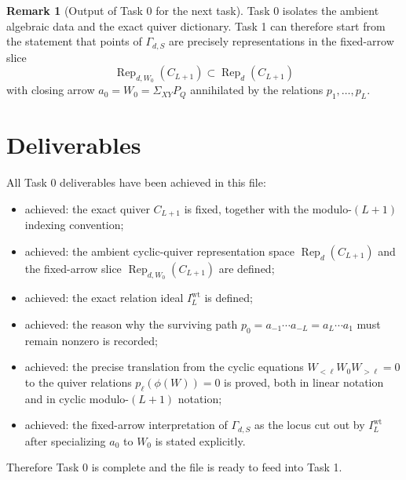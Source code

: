\documentclass{article}
\newcommand{\Rep}{\operatorname{Rep}}
\theoremstyle{definition}
\newtheorem{remark}[theorem]{Remark}
\begin{document}
\begin{remark}[Output of Task 0 for the next task]
Task 0 isolates the ambient algebraic data and the exact quiver dictionary.
Task 1 can therefore start from the statement that points of $\Gamma_{d,S}$ are
precisely representations in the fixed-arrow slice
\[
\Rep_{d,W_0}(C_{L+1})\subset \Rep_d(C_{L+1})
\]
with closing arrow
$a_0=W_0=\Sigma_{XY}P_Q$ annihilated by the relations
$p_1,\dots,p_L$.
\end{remark}

\section{Deliverables}

All Task 0 deliverables have been achieved in this file:

\begin{itemize}
\item achieved: the exact quiver $C_{L+1}$ is fixed, together with the
  modulo-$(L+1)$ indexing convention;
\item achieved: the ambient cyclic-quiver representation space
  $\Rep_d(C_{L+1})$ and the fixed-arrow slice
  $\Rep_{d,W_0}(C_{L+1})$ are defined;
\item achieved: the exact relation ideal $I_L^{\mathrm{wt}}$ is defined;
\item achieved: the reason why the surviving path
  $p_0=a_{-1}\cdots a_{-L}=a_L\cdots a_1$ must remain nonzero is recorded;
\item achieved: the precise translation from the cyclic equations
  $W_{<\ell}W_0W_{>\ell}=0$ to the quiver relations $p_\ell(\phi(W))=0$ is
  proved, both in linear notation and in cyclic modulo-$(L+1)$ notation;
\item achieved: the fixed-arrow interpretation of $\Gamma_{d,S}$ as the locus
  cut out by $I_L^{\mathrm{wt}}$ after specializing $a_0$ to $W_0$ is stated
  explicitly.
\end{itemize}

Therefore Task 0 is complete and the file is ready to feed into Task 1.
\end{document}
